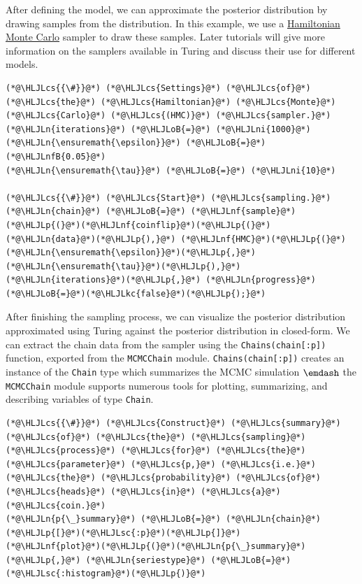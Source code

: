 \documentclass[12pt,a4paper]{article}
\newcommand{\HLJLkc}[1]{\textcolor[RGB]{59,151,46}{\textit{#1}}}
\newcommand{\HLJLn}[1]{#1}
\newcommand{\HLJLnf}[1]{\textcolor[RGB]{66,102,213}{#1}}
\newcommand{\HLJLsc}[1]{\textcolor[RGB]{201,61,57}{#1}}
\newcommand{\HLJLnfB}[1]{\textcolor[RGB]{59,151,46}{#1}}
\newcommand{\HLJLni}[1]{\textcolor[RGB]{59,151,46}{#1}}
\newcommand{\HLJLoB}[1]{\textcolor[RGB]{102,102,102}{\textbf{#1}}}
\newcommand{\HLJLp}[1]{#1}
\newcommand{\HLJLcs}[1]{\textcolor[RGB]{153,153,119}{\textit{#1}}}
\begin{document}
After defining the model, we can approximate the posterior distribution by drawing samples from the distribution. In this example, we use a \href{https://en.wikipedia.org/wiki/Hamiltonian_Monte_Carlo}{Hamiltonian Monte Carlo} sampler to draw these samples. Later tutorials will give more information on the samplers available in Turing and discuss their use for different models.


\begin{lstlisting}
(*@\HLJLcs{{\#}}@*) (*@\HLJLcs{Settings}@*) (*@\HLJLcs{of}@*) (*@\HLJLcs{the}@*) (*@\HLJLcs{Hamiltonian}@*) (*@\HLJLcs{Monte}@*) (*@\HLJLcs{Carlo}@*) (*@\HLJLcs{(HMC)}@*) (*@\HLJLcs{sampler.}@*)
(*@\HLJLn{iterations}@*) (*@\HLJLoB{=}@*) (*@\HLJLni{1000}@*)
(*@\HLJLn{\ensuremath{\epsilon}}@*) (*@\HLJLoB{=}@*) (*@\HLJLnfB{0.05}@*)
(*@\HLJLn{\ensuremath{\tau}}@*) (*@\HLJLoB{=}@*) (*@\HLJLni{10}@*)

(*@\HLJLcs{{\#}}@*) (*@\HLJLcs{Start}@*) (*@\HLJLcs{sampling.}@*)
(*@\HLJLn{chain}@*) (*@\HLJLoB{=}@*) (*@\HLJLnf{sample}@*)(*@\HLJLp{(}@*)(*@\HLJLnf{coinflip}@*)(*@\HLJLp{(}@*)(*@\HLJLn{data}@*)(*@\HLJLp{),}@*) (*@\HLJLnf{HMC}@*)(*@\HLJLp{(}@*)(*@\HLJLn{\ensuremath{\epsilon}}@*)(*@\HLJLp{,}@*) (*@\HLJLn{\ensuremath{\tau}}@*)(*@\HLJLp{),}@*) (*@\HLJLn{iterations}@*)(*@\HLJLp{,}@*) (*@\HLJLn{progress}@*)(*@\HLJLoB{=}@*)(*@\HLJLkc{false}@*)(*@\HLJLp{);}@*)
\end{lstlisting}


After finishing the sampling process, we can visualize the posterior distribution approximated using Turing against the posterior distribution in closed-form. We can extract the chain data from the sampler using the \texttt{Chains(chain[:p])} function, exported from the \texttt{MCMCChain} module. \texttt{Chains(chain[:p])} creates an instance of the \texttt{Chain} type which summarizes the MCMC simulation \ensuremath{\emdash} the \texttt{MCMCChain} module supports numerous tools for plotting, summarizing, and describing variables of type \texttt{Chain}.


\begin{lstlisting}
(*@\HLJLcs{{\#}}@*) (*@\HLJLcs{Construct}@*) (*@\HLJLcs{summary}@*) (*@\HLJLcs{of}@*) (*@\HLJLcs{the}@*) (*@\HLJLcs{sampling}@*) (*@\HLJLcs{process}@*) (*@\HLJLcs{for}@*) (*@\HLJLcs{the}@*) (*@\HLJLcs{parameter}@*) (*@\HLJLcs{p,}@*) (*@\HLJLcs{i.e.}@*) (*@\HLJLcs{the}@*) (*@\HLJLcs{probability}@*) (*@\HLJLcs{of}@*) (*@\HLJLcs{heads}@*) (*@\HLJLcs{in}@*) (*@\HLJLcs{a}@*) (*@\HLJLcs{coin.}@*)
(*@\HLJLn{p{\_}summary}@*) (*@\HLJLoB{=}@*) (*@\HLJLn{chain}@*)(*@\HLJLp{[}@*)(*@\HLJLsc{:p}@*)(*@\HLJLp{]}@*)
(*@\HLJLnf{plot}@*)(*@\HLJLp{(}@*)(*@\HLJLn{p{\_}summary}@*)(*@\HLJLp{,}@*) (*@\HLJLn{seriestype}@*) (*@\HLJLoB{=}@*) (*@\HLJLsc{:histogram}@*)(*@\HLJLp{)}@*)
\end{lstlisting}
\end{document}
